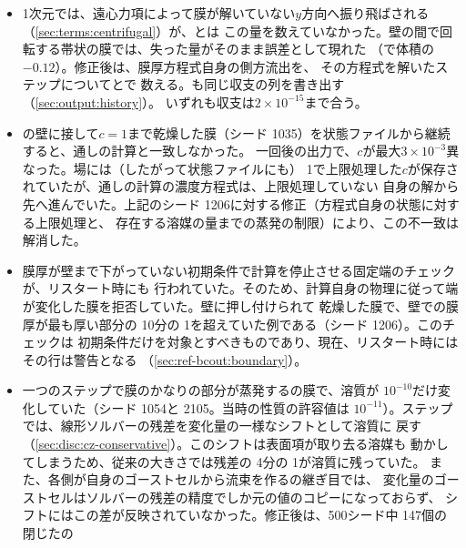 \begin{itemize}
    しまい、の終了時に\SI{0.37}{\percent}、接触線の
    ケースで最大\SI{0.5}{\percent}進んでいた。ノズルと製造解の生成項は誤った
    時刻で評価され、定常状態の判定に用いる変化率は誤った刻みで割られていた。
    では、膜は古い刻みで解いたのに、そのステップの膜の更新と濃度には新しい刻みを
    用いていた。修正後は、延ばした刻みは次のステップから適用される。
  \item 1次元では、遠心力項によって膜が解いていない$y$方向へ振り飛ばされる
    （\cref{sec:terms:centrifugal}）が、とは
    この量を数えていなかった。壁の間で回転する帯状の膜では、失った量がそのまま誤差として現れた
    （で体積の$-0.12$）。修正後は、膜厚方程式自身の側方流出を、
    その方程式を解いたステップについてとで
    数える。も同じ収支の列を書き出す（\cref{sec:output:history}）。
    いずれも収支は$2\times10^{-15}$まで合う。
  \item {}の壁に接して$c = 1$まで乾燥した膜（シード
    1035）を状態ファイルから継続すると、通しの計算と一致しなかった。
    一回後の出力で、$c$が最大$3\times10^{-3}$異なった。場には（したがって状態ファイルにも）
    1で上限処理した$c$が保存されていたが、通しの計算の濃度方程式は、上限処理していない
    自身の解から先へ進んでいた。上記のシード 1206に対する修正（方程式自身の状態に対する上限処理と、
    存在する溶媒の量までの蒸発の制限）により、この不一致は解消した。
  \item 膜厚が壁まで下がっていない初期条件で計算を停止させる固定端のチェックが、リスタート時にも
    行われていた。そのため、計算自身の物理に従って端が変化した膜を拒否していた。壁に押し付けられて
    乾燥した膜で、壁での膜厚が最も厚い部分の 10分の 1を超えていた例である（シード 1206）。このチェックは
    初期条件だけを対象とすべきものであり、現在、リスタート時にはその行は警告となる
    （\cref{sec:ref-bcout:boundary}）。
  \item 一つのステップで膜のかなりの部分が蒸発するの膜で、溶質が
    $10^{-10}$だけ変化していた（シード 1054と 2105。当時の性質の許容値は
    $10^{-11}$）。ステップでは、線形ソルバーの残差を変化量の一様なシフトとして溶質に
    戻す（\cref{sec:disc:cz-conservative}）。このシフトは表面項が取り去る溶媒も
    動かしてしまうため、従来の大きさでは残差の 4分の 1が溶質に残っていた。
    また、各側が自身のゴーストセルから流束を作るの継ぎ目では、
    変化量のゴーストセルはソルバーの残差の精度でしか元の値のコピーになっておらず、
    シフトにはこの差が反映されていなかった。修正後は、500シード中 147個の閉じたの

\end{itemize}
